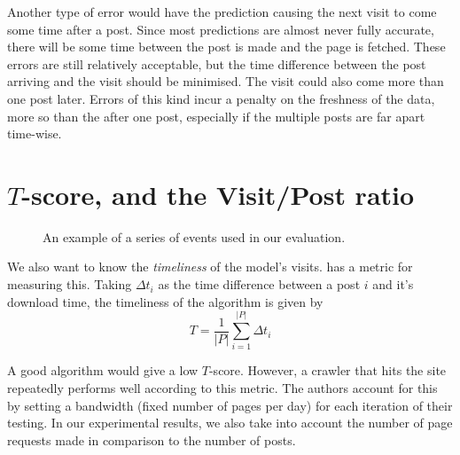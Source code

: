 Another type of error would have the prediction causing the next visit to come 
some time after a post. Since most predictions are almost never fully accurate, 
there will be some time between the post is made and the page is fetched. These 
errors are still relatively acceptable, but the time difference between the post 
arriving and the visit should be minimised. The visit could also come more than 
one post later. Errors of this kind incur a penalty on the freshness of the 
data, more so than the after one post, especially if the multiple posts are far 
apart time-wise.

\section{$T$-score, and the Visit/Post ratio}

\begin{figure}
	\begin{center}
	
	\caption{An example of a series of events used in our evaluation.}
	\end{center}
\end{figure}

We also want to know the \emph{timeliness} of the model's visits.  
 has a metric for measuring this. Taking $\Delta t_i$ as the 
time difference between a post $i$ and it's download time, the timeliness of the 
algorithm is given by
\[
	T = \frac{1}{|P|} \sum^{|P|}_{i=1}\Delta t_i
\]

A good algorithm would give a low $T$-score. However, a crawler that hits the 
site repeatedly performs well according to this metric. The authors account for 
this by setting a bandwidth (fixed number of pages per day) for each iteration 
of their testing. In our experimental results, we also take into account the 
number of page requests made in comparison to the number of posts. %

